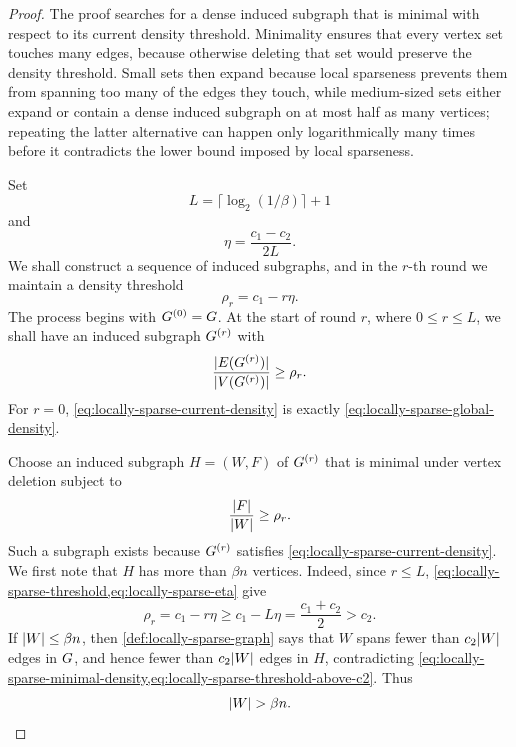 \begin{proof}
	The proof searches for a dense induced subgraph that is minimal with respect to its current density threshold. Minimality ensures that every vertex set touches many edges, because otherwise deleting that set would preserve the density threshold. Small sets then expand because local sparseness prevents them from spanning too many of the edges they touch, while medium-sized sets either expand or contain a dense induced subgraph on at most half as many vertices; repeating the latter alternative can happen only logarithmically many times before it contradicts the lower bound imposed by local sparseness.

	Set
	\begin{equation}
		\label{eq:locally-sparse-rounds}
		L=\lceil \log_2(1/\beta)\rceil+1
	\end{equation}
	and
	\begin{equation}
		\label{eq:locally-sparse-eta}
		\eta=\frac{c_1-c_2}{2L}.
	\end{equation}
	We shall construct a sequence of induced subgraphs, and in the \(r\)-th round we maintain a density threshold
	\begin{equation}
		\label{eq:locally-sparse-threshold}
		\rho_r=c_1-r\eta.
	\end{equation}
	The process begins with \(G^{(0)}=G\). At the start of round \(r\), where \(0\leq r\leq L\), we shall have an induced subgraph \(G^{(r)}\) with
	\begin{equation}
		\label{eq:locally-sparse-current-density}
		\frac{\lvert E(G^{(r)})\rvert}{\lvert V(G^{(r)})\rvert}\geq \rho_r.
	\end{equation}
	For \(r=0\), \cref{eq:locally-sparse-current-density} is exactly \cref{eq:locally-sparse-global-density}.

	Choose an induced subgraph \(H=(W,F)\) of \(G^{(r)}\) that is minimal under vertex deletion subject to
	\begin{equation}
		\label{eq:locally-sparse-minimal-density}
		\frac{\lvert F\rvert}{\lvert W\rvert}\geq \rho_r.
	\end{equation}
	Such a subgraph exists because \(G^{(r)}\) satisfies \cref{eq:locally-sparse-current-density}. We first note that \(H\) has more than \(\beta n\) vertices. Indeed, since \(r\leq L\), \cref{eq:locally-sparse-threshold,eq:locally-sparse-eta} give
	\begin{equation}
		\label{eq:locally-sparse-threshold-above-c2}
		\rho_r=c_1-r\eta\geq c_1-L\eta=\frac{c_1+c_2}{2}>c_2.
	\end{equation}
	If \(\lvert W\rvert\leq \beta n\), then \cref{def:locally-sparse-graph} says that \(W\) spans fewer than \(c_2\lvert W\rvert\) edges in \(G\), and hence fewer than \(c_2\lvert W\rvert\) edges in \(H\), contradicting \cref{eq:locally-sparse-minimal-density,eq:locally-sparse-threshold-above-c2}. Thus
	\begin{equation}
		\label{eq:locally-sparse-current-size}
		\lvert W\rvert>\beta n.
	\end{equation}


\end{proof}
